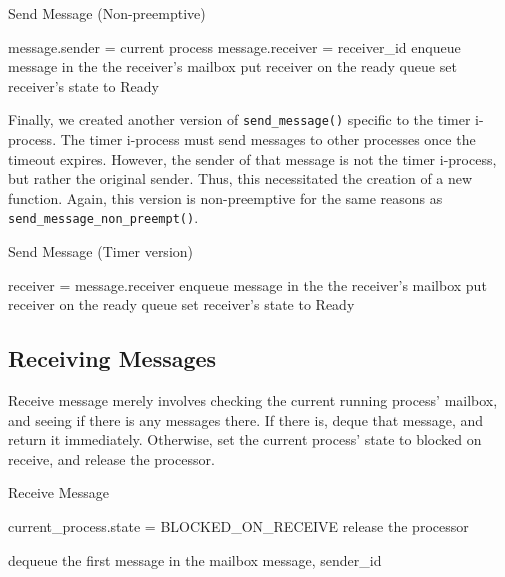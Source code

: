 \documentclass[12pt]{report}
\begin{document}
\begin{algorithm}[H]
	\caption{Send Message (Non-preemptive)}
	\begin{algorithmic}[1]
			\State message.sender = current process
			\State message.receiver = receiver_id
			\State enqueue message in the the receiver's mailbox
				\State put receiver on the ready queue
				\State set receiver's state to Ready
			\EndIf
		\EndFunction
	\end{algorithmic}
\end{algorithm}


Finally, we created another version of \texttt{send_message()} specific to the timer i-process. The timer i-process must send messages to other processes once the timeout expires. However, the sender of that message is not the timer i-process, but rather the original sender. Thus, this necessitated the creation of a new function. Again, this version is non-preemptive for the same reasons as \texttt{send_message_non_preempt()}.

\begin{algorithm}[H]
	\caption{Send Message (Timer version)}
	\begin{algorithmic}[1]
			\State receiver = message.receiver
			\State enqueue message in the the receiver's mailbox
				\State put receiver on the ready queue
				\State set receiver's state to Ready
			\EndIf
		\EndFunction
	\end{algorithmic}
\end{algorithm}

\subsection{Receiving Messages}

Receive message merely involves checking the current running process' mailbox, and seeing if there is any messages there. If there is, deque that message, and return it immediately. Otherwise, set the current process' state to blocked on receive, and release the processor.

\begin{algorithm}[H]
	\caption{Receive Message}
	\begin{algorithmic}[1]
				\State current_process.state = BLOCKED_ON_RECEIVE
				\State release the processor
			\EndWhile

			\State dequeue the first message in the mailbox
			\State\Return message, sender_id
		\EndFunction
	\end{algorithmic}
\end{algorithm}
\end{document}
